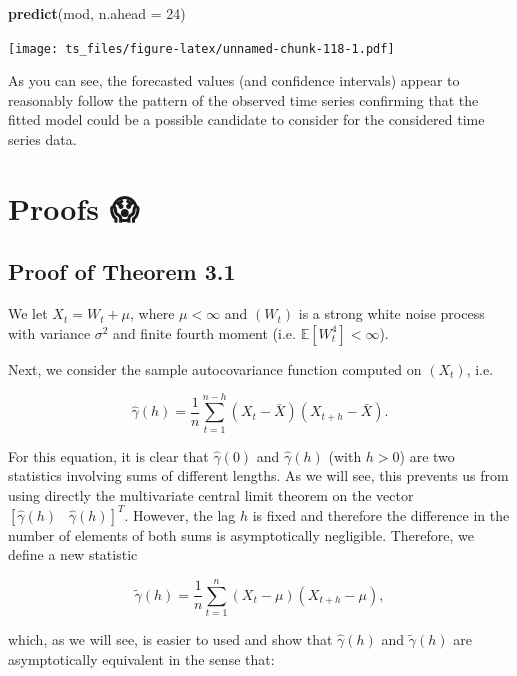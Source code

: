 \documentclass[]{book}
\newenvironment{Shaded}{\begin{snugshade}}{\end{snugshade}}
\newcommand{\KeywordTok}[1]{\textcolor[rgb]{0.13,0.29,0.53}{\textbf{#1}}}
\newcommand{\DataTypeTok}[1]{\textcolor[rgb]{0.13,0.29,0.53}{#1}}
\newcommand{\DecValTok}[1]{\textcolor[rgb]{0.00,0.00,0.81}{#1}}
\newcommand{\NormalTok}[1]{#1}
\theoremstyle{definition}
\theoremstyle{definition}
\theoremstyle{definition}
\theoremstyle{remark}
\begin{document}
\begin{Shaded}
\begin{Highlighting}[]
\KeywordTok{predict}\NormalTok{(mod, }\DataTypeTok{n.ahead =} \DecValTok{24}\NormalTok{)}
\end{Highlighting}
\end{Shaded}

\texttt{[image: ts\_files/figure-latex/unnamed-chunk-118-1.pdf]}

As you can see, the forecasted values (and confidence intervals) appear
to reasonably follow the pattern of the observed time series confirming
that the fitted model could be a possible candidate to consider for the
considered time series data.

\appendix


\chapter{Proofs 😱}\label{proofs}

\section{Proof of Theorem 3.1}\label{appendixa}

We let \(X_t = W_t + \mu\), where \(\mu < \infty\) and \((W_t)\) is a
strong white noise process with variance \(\sigma^2\) and finite fourth
moment (i.e. \(\mathbb{E} [W_t^4] < \infty\)).

Next, we consider the sample autocovariance function computed on
\((X_t)\), i.e.

\[
\hat \gamma \left( h \right) = \frac{1}{n}\sum\limits_{t = 1}^{n - h} {\left( {{X_t} - \bar X} \right)\left( {{X_{t + h}} - \bar X} \right)}.
\]

For this equation, it is clear that \(\hat \gamma \left( 0 \right)\) and
\(\hat \gamma \left( h \right)\) (with \(h > 0\)) are two statistics
involving sums of different lengths. As we will see, this prevents us
from using directly the multivariate central limit theorem on the vector
\([ \hat \gamma \left( h \right) \;\;\; \hat \gamma \left( h \right) ]^T\).
However, the lag \(h\) is fixed and therefore the difference in the
number of elements of both sums is asymptotically negligible. Therefore,
we define a new statistic

\[\tilde{\gamma} \left( h \right) = \frac{1}{n}\sum\limits_{t = 1}^{n} {\left( {{X_t} - \mu} \right)\left( {{X_{t + h}} - \mu} \right)},
\]

which, as we will see, is easier to used and show that
\(\hat \gamma \left( h \right)\) and \(\tilde{\gamma} \left( h \right)\)
are asymptotically equivalent in the sense that:
\end{document}
